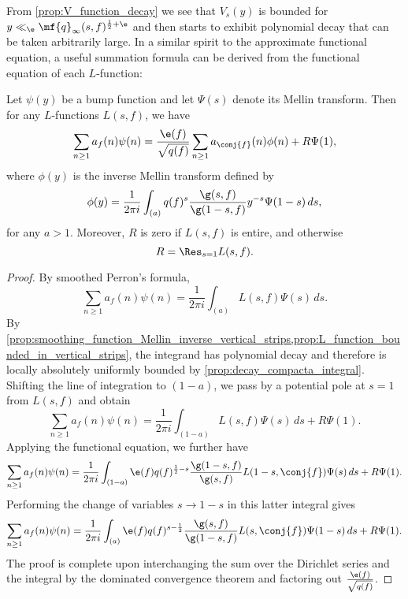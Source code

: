     From \cref{prop:V_function_decay} we see that $V_{s}(y)$ is bounded for $y \ll_{\e} \mf{q}_{\infty}(s,f)^{\frac{1}{2}+\e}$ and then starts to exhibit polynomial decay that can be taken arbitrarily large. In a similar spirit to the approximate functional equation, a useful summation formula can be derived from the functional equation of each $L$-function:

    \begin{theorem}
      Let $\psi(y)$ be a bump function and let $\Psi(s)$ denote its Mellin transform. Then for any $L$-functions $L(s,f)$, we have
      \[
        \sum_{n \ge 1}a_{f}(n)\psi(n) = \frac{\e(f)}{\sqrt{q(f)}}\sum_{n \ge 1}a_{\conj{f}}(n)\phi(n)+R\Psi(1),
      \]
      where $\phi(y)$ is the inverse Mellin transform defined by
      \[
        \phi(y) = \frac{1}{2\pi i}\int_{(a)}q(f)^{s}\frac{\g(s,f)}{\g(1-s,f)}y^{-s}\Psi(1-s)\,ds,
      \]
      for any $a > 1$. Moreover, $R$ is zero if $L(s,f)$ is entire, and otherwise
      \[
        R = \Res_{s = 1}L(s,f).
      \]
    \end{theorem}
    \begin{proof}
      By smoothed Perron's formula,
      \[
        \sum_{n \ge 1}a_{f}(n)\psi(n) = \frac{1}{2\pi i}\int_{(a)}L(s,f)\Psi(s)\,ds.
      \]
      By \cref{prop:smoothing_function_Mellin_inverse_vertical_strips,prop:L_function_bounded_in_vertical_strips}, the integrand has polynomial decay and therefore is locally absolutely uniformly bounded by \cref{prop:decay_compacta_integral}. Shifting the line of integration to $(1-a)$, we pass by a potential pole at $s = 1$ from $L(s,f)$ and obtain
      \[
        \sum_{n \ge 1}a_{f}(n)\psi(n) = \frac{1}{2\pi i}\int_{(1-a)}L(s,f)\Psi(s)\,ds+R\Psi(1).
      \]
      Applying the functional equation, we further have
      \[
        \sum_{n \ge 1}a_{f}(n)\psi(n) = \frac{1}{2\pi i}\int_{(1-a)}\e(f)q(f)^{\frac{1}{2}-s}\frac{\g(1-s,f)}{\g(s,f)}L(1-s,\conj{f})\Psi(s)\,ds+R\Psi(1).
      \]
      Performing the change of variables $s \to 1-s$ in this latter integral gives
      \[
        \sum_{n \ge 1}a_{f}(n)\psi(n) = \frac{1}{2\pi i}\int_{(a)}\e(f)q(f)^{s-\frac{1}{2}}\frac{\g(s,f)}{\g(1-s,f)}L(s,\conj{f})\Psi(1-s)\,ds+R\Psi(1).
      \]
      The proof is complete upon interchanging the sum over the Dirichlet series and the integral by the dominated convergence theorem and factoring out $\frac{\e(f)}{\sqrt{q(f)}}$.
    \end{proof}
